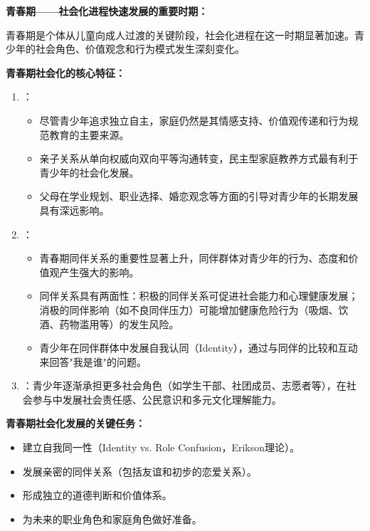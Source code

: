 \begin{defbox}
\textbf{青春期——社会化进程快速发展的重要时期：}

青春期是个体从儿童向成人过渡的关键阶段，社会化进程在这一时期显著加速。青少年的社会角色、价值观念和行为模式发生深刻变化。

\textbf{青春期社会化的核心特征：}
\begin{enumerate}[leftmargin=*]
    \item {}：
    \begin{itemize}[leftmargin=*]
        \item 尽管青少年追求独立自主，家庭仍然是其情感支持、价值观传递和行为规范教育的主要来源。
        \item 亲子关系从单向权威向双向平等沟通转变，民主型家庭教养方式最有利于青少年的社会化发展。
        \item 父母在学业规划、职业选择、婚恋观念等方面的引导对青少年的长期发展具有深远影响。
    \end{itemize}

    \item {}：
    \begin{itemize}[leftmargin=*]
        \item 青春期同伴关系的重要性显著上升，同伴群体对青少年的行为、态度和价值观产生强大的影响。
        \item 同伴关系具有两面性：积极的同伴关系可促进社会能力和心理健康发展；消极的同伴影响（如不良同伴压力）可能增加健康危险行为（吸烟、饮酒、药物滥用等）的发生风险。
        \item 青少年在同伴群体中发展自我认同（Identity），通过与同伴的比较和互动来回答"我是谁"的问题。
    \end{itemize}

    \item {}：青少年逐渐承担更多社会角色（如学生干部、社团成员、志愿者等），在社会参与中发展社会责任感、公民意识和多元文化理解能力。
\end{enumerate}

\textbf{青春期社会化发展的关键任务：}
\begin{itemize}[leftmargin=*]
    \item 建立自我同一性（Identity vs. Role Confusion，Erikson理论）。
    \item 发展亲密的同伴关系（包括友谊和初步的恋爱关系）。
    \item 形成独立的道德判断和价值体系。
    \item 为未来的职业角色和家庭角色做好准备。
\end{itemize}
\end{defbox}

\newpage
